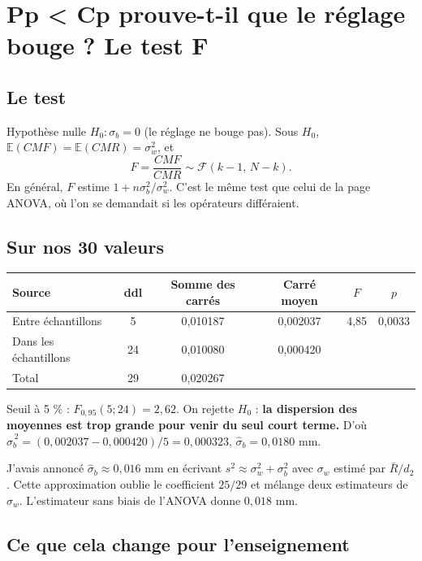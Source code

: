 \documentclass[11pt,a4paper]{article}
\theoremstyle{tq}
\theoremstyle{remark}
\newcommand{\E}{\mathbb{E}}
\newcommand{\Rb}{\bar{R}}
\newcommand{\sw}{\sigma_w}
\newcommand{\sbt}{\sigma_b}
\begin{document}
\section{Pp < Cp prouve-t-il que le réglage bouge ? Le test F}

\subsection{Le test}

Hypothèse nulle $H_0 : \sbt = 0$ (le réglage ne bouge pas). Sous $H_0$, $\E(CMF)=\E(CMR)=\sw^2$, et
\[
F = \frac{CMF}{CMR} \sim \mathcal F(k-1,\,N-k).
\]
En général, $F$ estime $1 + n\sbt^2/\sw^2$. C'est le même test que celui de la page ANOVA, où l'on se demandait si les opérateurs différaient.

\subsection{Sur nos 30 valeurs}

\begin{center}
\begin{tabular}{@{}lccccc@{}}
\toprule
Source & ddl & Somme des carrés & Carré moyen & $F$ & $p$\\
\midrule
Entre échantillons & 5 & 0,010187 & 0,002037 & 4,85 & 0,0033\\
Dans les échantillons & 24 & 0,010080 & 0,000420 & & \\
\midrule
Total & 29 & 0,020267 & & & \\
\bottomrule
\end{tabular}
\end{center}

Seuil à 5 \% : $F_{0{,}95}(5;24) = 2{,}62$. On rejette $H_0$ : \textbf{la dispersion des moyennes est trop grande pour venir du seul court terme.} D'où $\hat\sigma_b^{\,2} = (0{,}002037-0{,}000420)/5 = 0{,}000323$, $\hat\sigma_b = 0{,}0180$ mm.

\begin{alerte}
J'avais annoncé $\hat\sigma_b \approx 0{,}016$ mm en écrivant $s^2 \approx \sw^2+\sbt^2$ avec $\sw$ estimé par $\Rb/d_2$. Cette approximation oublie le coefficient $25/29$ et mélange deux estimateurs de $\sw$. L'estimateur sans biais de l'ANOVA donne $0{,}018$ mm.
\end{alerte}

\subsection{Ce que cela change pour l'enseignement}
\end{document}
